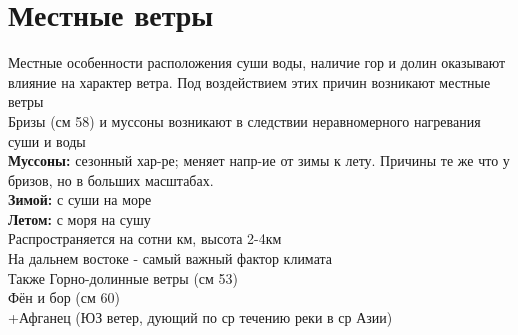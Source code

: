
\section{Местные ветры}
Местные особенности расположения суши воды, наличие гор и долин оказывают влияние на характер ветра. Под воздействием этих причин возникают местные ветры\\
Бризы (см 58) и муссоны возникают в следствии неравномерного нагревания суши и воды\\
\textbf{Муссоны:} сезонный хар-ре; меняет напр-ие от зимы к лету. Причины те же что у бризов, но в больших масштабах.\\
\textbf{Зимой:} с суши на море\\
\textbf{Летом:} с моря на сушу\\
Распространяется на сотни км, высота 2-4км\\
На дальнем востоке - самый важный фактор климата\\

Также Горно-долинные ветры (см 53)\\
Фён и бор (см 60)\\
+Афганец (ЮЗ ветер, дующий по ср течению реки в ср Азии)